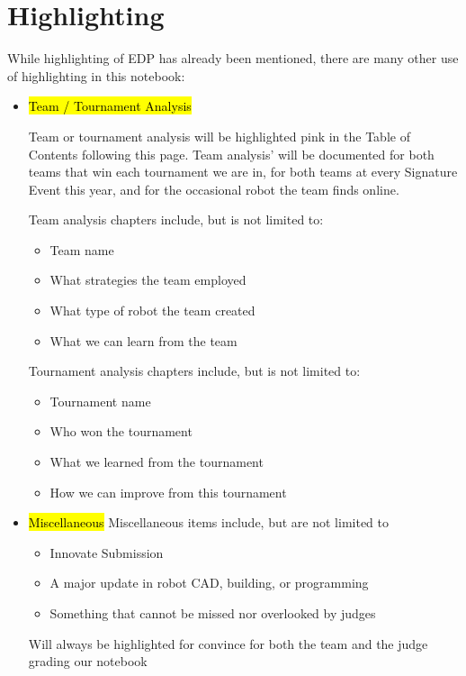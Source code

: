 \section*{Highlighting}
    While highlighting of EDP has already been mentioned, there are many other use of highlighting in this notebook:
    \begin{itemize}
        \item {}\hl{Team / Tournament Analysis} 
        
        Team or tournament analysis will be highlighted pink in the Table of Contents following this page. Team analysis' will be documented for both teams that win each tournament we are in, for both teams at every Signature Event this year, and for the occasional robot the team finds online.
        
        Team analysis chapters include, but is not limited to:
            \begin{itemize}
                \item Team name
                \item What strategies the team employed 
                \item What type of robot the team created 
                \item What we can learn from the team
            \end{itemize}
        
        Tournament analysis chapters include, but is not limited to:
            \begin{itemize}
                \item Tournament name
                \item Who won the tournament
                \item What we learned from the tournament
                \item How we can improve from this tournament
            \end{itemize}
        \item {}\hl{Miscellaneous} 
        Miscellaneous items include, but are not limited to 
        \begin{itemize}
            \item Innovate Submission
            \item A major update in robot CAD, building, or programming
            \item Something that cannot be missed nor overlooked by judges
        \end{itemize}
        Will always be highlighted for convince for both the team and the judge grading our notebook
    \end{itemize}
